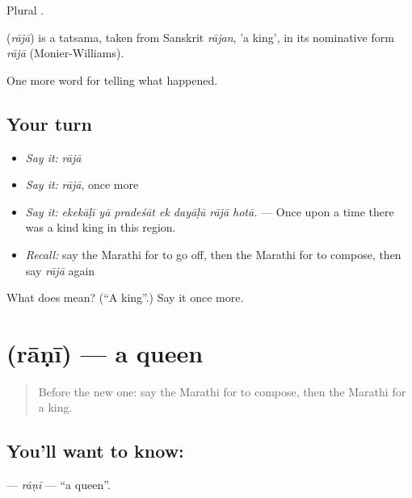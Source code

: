 Plural .

\begin{cousinweb}
\textbf{} (\emph{rājā}) is a tatsama, taken from Sanskrit \emph{rājan}, 'a king', in its nominative form \emph{rājā} (Monier-Williams).
\end{cousinweb}

\begin{grammarlens}[title={What you've built}]
One more word for telling what happened.
\end{grammarlens}

\subsection*{Your turn}
\begin{itemize}
\raggedright
  \item \emph{Say it:} \emph{rājā}
  \item \emph{Say it:} \emph{rājā}, once more
  \item \emph{Say it:} \emph{ekekāḷī yā pradeśāt ek dayāḷū rājā hotā.} — Once upon a time there was a kind king in this region.
  \item \emph{Recall:} say the Marathi for to go off, then the Marathi for to compose, then say \emph{rājā} again
\end{itemize}

\begin{tcolorbox}[breakable,colback=teal!4,colframe=teal!35!black,title={Before you move on}]
What does  mean? (\textquotedblleft{}A king\textquotedblright{}.) Say it once more.
\end{tcolorbox}
\section[\texorpdfstring{\mr{राणी} (rāṇī)}{राणी (rāṇī)}]{ (rāṇī) — a queen}

\label{lesson:MR-C325-rani}



\begin{quote}
Before the new one: say the Marathi for to compose, then the Marathi for a king.
\end{quote}

\subsection*{You'll want to know: }
\textbf{} — \emph{rāṇī} — \textquotedblleft{}a queen\textquotedblright{}.

